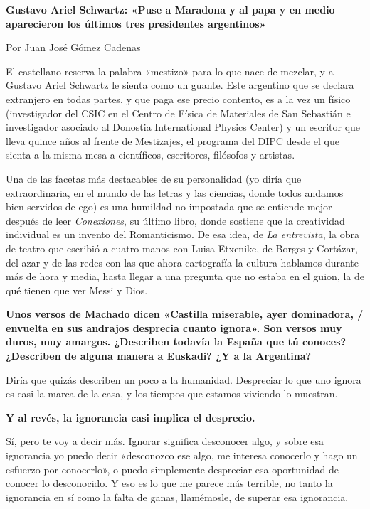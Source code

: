 \documentclass[11pt,a4paper]{article}
\newcommand{\preg}[1]{\textbf{#1}}
\begin{document}
\begin{center}
{\LARGE\bfseries Gustavo Ariel Schwartz: «Puse a Maradona y al papa y en medio aparecieron los últimos tres presidentes argentinos»\par}
\vspace{1em}
{\large Por Juan José Gómez Cadenas\par}
\end{center}
\vspace{1.5em}

El castellano reserva la palabra «mestizo» para lo que nace de mezclar, y a Gustavo Ariel Schwartz le sienta como un guante. Este argentino que se declara extranjero en todas partes, y que paga ese precio contento, es a la vez un físico (investigador del CSIC en el Centro de Física de Materiales de San Sebastián e investigador asociado al Donostia International Physics Center) y un escritor que lleva quince años al frente de Mestizajes, el programa del DIPC desde el que sienta a la misma mesa a científicos, escritores, filósofos y artistas.

Una de las facetas más destacables de su personalidad (yo diría que extraordinaria, en el mundo de las letras y las ciencias, donde todos andamos bien servidos de ego) es una humildad no impostada que se entiende mejor después de leer \emph{Conexiones}, su último libro, donde sostiene que la creatividad individual es un invento del Romanticismo. De esa idea, de \emph{La entrevista}, la obra de teatro que escribió a cuatro manos con Luisa Etxenike, de Borges y Cortázar, del azar y de las redes con las que ahora cartografía la cultura hablamos durante más de hora y media, hasta llegar a una pregunta que no estaba en el guion, la de qué tienen que ver Messi y Dios.

\preg{Unos versos de Machado dicen «Castilla miserable, ayer dominadora, / envuelta en sus andrajos desprecia cuanto ignora». Son versos muy duros, muy amargos. ¿Describen todavía la España que tú conoces? ¿Describen de alguna manera a Euskadi? ¿Y a la Argentina?}

Diría que quizás describen un poco a la humanidad. Despreciar lo que uno ignora es casi la marca de la casa, y los tiempos que estamos viviendo lo muestran.

\preg{Y al revés, la ignorancia casi implica el desprecio.}

Sí, pero te voy a decir más. Ignorar significa desconocer algo, y sobre esa ignorancia yo puedo decir «desconozco ese algo, me interesa conocerlo y hago un esfuerzo por conocerlo», o puedo simplemente despreciar esa oportunidad de conocer lo desconocido. Y eso es lo que me parece más terrible, no tanto la ignorancia en sí como la falta de ganas, llamémosle, de superar esa ignorancia.
\end{document}
